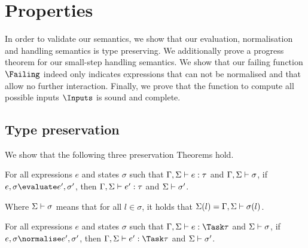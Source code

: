 


\section{Properties}
\label{sec:properties}




In order to validate our semantics, we show that our evaluation, normalisation
and handling semantics is type preserving. We additionally prove a progress
theorem for our small-step handling semantics.
We show that our failing function $\Failing$ indeed only indicates expressions
that can not be normalised and that allow no further interaction.
Finally, we prove that the function to compute all possible inputs $\Inputs$ is sound and complete.


\subsection{Type preservation}
\label{sub:preservation}

We show that the following three preservation Theorems hold.

\begin{theorem}
  For all expressions $e$ and states $\sigma$
  such that $\Gamma,\Sigma \vdash e:\tau$ and $\Gamma,\Sigma \vdash \sigma$,
  if $e,\sigma \evaluate e',\sigma'$,
  then $\Gamma,\Sigma \vdash e':\tau$ and $\Sigma \vdash \sigma'$.
  \label{thm:pres-eval}
\end{theorem}

\noindent
Where $\Sigma \vdash \sigma$ means that for all $l\in \sigma$, it holds that
$\Sigma(l)=\Gamma,\Sigma\vdash \sigma(l)$.


\begin{theorem}
  For all expressions $e$ and states $\sigma$
  such that $\Gamma,\Sigma \infers e:\Task\tau$ and $\Sigma \vdash \sigma$,
  if $e,\sigma \normalise e',\sigma'$,
  then $\Gamma,\Sigma \infers e':\Task\tau$ and $\Sigma \vdash \sigma'$.
  \label{thm:pres-norm}
\end{theorem}

